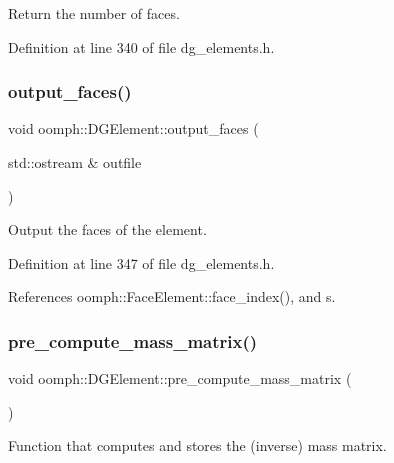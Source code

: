 Return the number of faces. 



Definition at line 340 of file dg\+\_\+elements.\+h.

\mbox{\label{classoomph_1_1DGElement_ab4d6f236fcfaca280473ad9177b296e9}} 
\subsubsection{\texorpdfstring{output\+\_\+faces()}{output\_faces()}}
{\footnotesize\ttfamily void oomph\+::\+D\+G\+Element\+::output\+\_\+faces (\begin{DoxyParamCaption}\item[{std\+::ostream \&}]{outfile }\end{DoxyParamCaption})\hspace{0.3cm}{\ttfamily [inline]}}



Output the faces of the element. 



Definition at line 347 of file dg\+\_\+elements.\+h.



References oomph\+::\+Face\+Element\+::face\+\_\+index(), and s.

\mbox{\label{classoomph_1_1DGElement_a56efa47ff13adce4b7d740290a208ddc}} 
\subsubsection{\texorpdfstring{pre\+\_\+compute\+\_\+mass\+\_\+matrix()}{pre\_compute\_mass\_matrix()}}
{\footnotesize\ttfamily void oomph\+::\+D\+G\+Element\+::pre\+\_\+compute\+\_\+mass\+\_\+matrix (\begin{DoxyParamCaption}{ }\end{DoxyParamCaption})}



Function that computes and stores the (inverse) mass matrix. 



